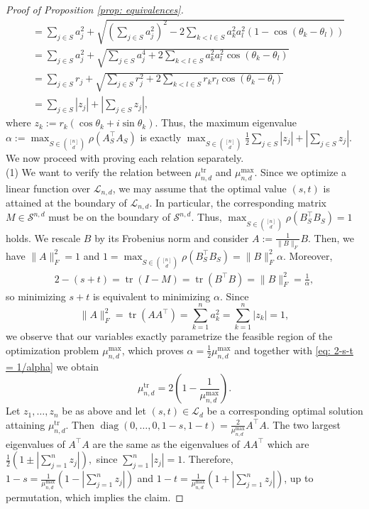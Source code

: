 \documentclass[10pt,a4paper]{amsart}
\def\S{\mathcal{S}}
\def\diag{\operatorname{diag}}
\def\tr{\operatorname{tr}}
\begin{document}
\begin{proof}[Proof of Proposition \ref{prop: equivalences}]
\begin{align*}
    &=\sum_{j \in S} a_j^2+\sqrt{\left(\sum_{j \in S} a_j^2\right)^2-2\sum_{k<l \in S}a_k^2a_l^2(1-\cos(\theta_k-\theta_l))}\\
    &=\sum_{j \in S} a_j^2+\sqrt{\sum_{j \in S} a_j^4+2\sum_{k<l \in S}a_k^2a_l^2\cos(\theta_k-\theta_l)}\\
    &=\sum_{j \in S} r_j+\sqrt{\sum_{j \in S} r_j^2+2\sum_{k<l \in S}r_kr_l\cos(\theta_k-\theta_l)}\\
    &=\sum_{j\in S}|z_j|+\left|\sum_{j\in S} z_j\right|,
\end{align*}
where $z_k:=r_k(\cos\theta_k+i\sin \theta_k)$. Thus, the maximum eigenvalue $\alpha := \max_{S \in \binom{[n]}{d}}\rho(A_S^\top A_S)$ is exactly $\max_{S \in \binom{[n]}{d}} \frac{1}{2}\sum_{j\in S}|z_j|+\left|\sum_{j\in S} z_j\right|$.
We now proceed with proving each relation separately.\\
(1) We want to verify the relation between $\mu_{n,d}^{\tr}$ and $\mu_{n,d}^{\max}$. Since we optimize a linear function over $\mathcal{L}_{n,d}$, we may assume that the optimal value $(s,t)$ is attained at the boundary of $\mathcal{L}_{n,d}$. In particular, the corresponding matrix $M \in \S^{n,d}$ must be on the boundary of $\S^{n,d}$. Thus, $\max_{S \in \binom{[n]}{d}} \rho(B_S^\top B_S)=1$ holds. We rescale $B$ by its Frobenius norm and consider $A := \frac{1}{\|B\|_F} B$. Then, we have $\|A\|_F^2 =1$ and $ 1 = \max_{S \in \binom{[n]}{d}} \rho(B_S^\top B_S) = \|B\|_F^2 \alpha.$ Moreover,
    \begin{align}\label{eq: 2-s-t = 1/alpha}
    2-(s + t) = \tr (I-M) = \tr (B^\top B)  = \|B\|_{F}^2 = \frac{1}{\alpha},
    \end{align}
    so minimizing $s+t$ is equivalent to minimizing $\alpha$. Since 
    \[
    \|A\|_F^2 = \tr(AA^\top) = \sum_{k=1}^n a_k^2 = \sum_{k=1}^n |z_k|=1,
    \]
    we observe that our variables exactly parametrize the feasible region of the optimization problem $\mu_{n,d}^{\max}$, which proves $\alpha = \frac{1}{2} \mu_{n,d}^{\max}$ and together with \eqref{eq: 2-s-t = 1/alpha} we obtain \[\mu_{n,d}^{\tr}=2\left(1-\frac{1}{\mu_{n,d}^{\max}}\right).\]
    Let $z_1,\dots,z_n$ be as above and let $(s,t) \in \mathcal{L}_d$ be a corresponding optimal solution attaining $\mu_{n,d}^{\tr}$. Then $\diag(0,\dots,0,1-s,1-t)=\frac{2}{\mu_{n,d}^{\max}}A^\top A$. The two largest eigenvalues of $A^\top A$ are the same as the eigenvalues of $AA^\top$ which are $\frac{1}{2}(1\pm | \sum_{j=1}^nz_j |),$
since $\sum_{j=1}^n |z_j| =1$.
Therefore, $1-s=\frac{1}{\mu_{n,d}^{\max}}(1-|\sum_{j=1}^n z_j|)$ and $1-t=\frac{1}{\mu_{n,d}^{\max}}(1+|\sum_{j=1}^n z_j|)$, up to permutation, which implies the claim.



\end{proof}
\end{document}
